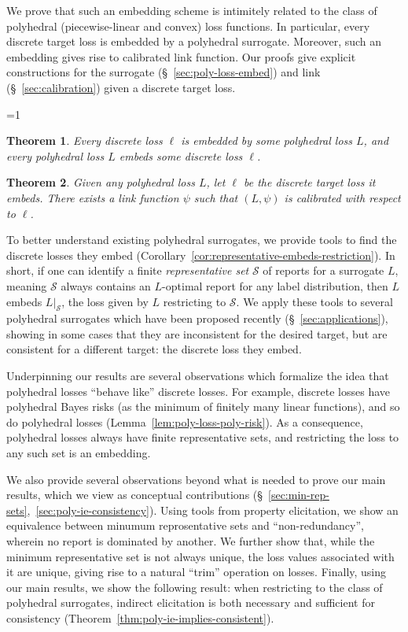 \documentclass[11pt]{article}
\newcommand{\Comments}{1}
\newcommand{\mytodo}[2]{\ifnum\Comments=1%
  \todo[linecolor=#1!80!black,backgroundcolor=#1,bordercolor=#1!80!black]{#2}\fi}
\newcommand{\jessiet}[1]{\mytodo{teal!20!white}{JF: #1}}
\newcommand{\Sc}{\mathcal{S}}
\newtheorem{theorem}{Theorem}
\begin{document}
We prove that such an embedding scheme is intimitely related to the class of polyhedral (piecewise-linear and convex) loss functions.
In particular, every discrete target loss is embedded by a polyhedral surrogate.
Moreover, such an embedding gives rise to calibrated link function.
Our proofs give explicit constructions for the surrogate (\S~\ref{sec:poly-loss-embed}) and link (\S~\ref{sec:calibration}) given a discrete target loss.

\jessiet{Want these as restatables so the numbering is consistent?}
\begin{theorem}\label{thm:embed-poly-informal}
  Every discrete loss $\ell$ is embedded by some polyhedral loss $L$, and every polyhedral loss $L$ embeds some discrete loss $\ell$.
\end{theorem}

\begin{theorem}\label{thm:link-informal}
  Given any polyhedral loss $L$, let $\ell$ be the discrete target loss it embeds. There exists a link function $\psi$ such that $(L,\psi)$ is calibrated with respect to $\ell$.
\end{theorem}

To better understand existing polyhedral surrogates, we provide tools to find the discrete losses they embed (Corollary~\ref{cor:representative-embeds-restriction}).
In short, if one can identify a finite \emph{representative set} $\Sc$ of reports for a surrogate $L$, meaning $\Sc$ always contains an $L$-optimal report for any label distribution, then $L$ embeds $L|_\Sc$, the loss given by $L$ restricting to $\Sc$.
We apply these tools to several polyhedral surrogates which have been proposed recently (\S~\ref{sec:applications}), showing in some cases that they are inconsistent for the desired target, but are consistent for a different target: the discrete loss they embed.

Underpinning our results are several observations which formalize the idea that polyhedral losses ``behave like'' discrete losses.
For example, discrete losses have polyhedral Bayes risks (as the minimum of finitely many linear functions), and so do polyhedral losses (Lemma~\ref{lem:poly-loss-poly-risk}).
As a consequence, polyhedral losses always have finite representative sets, and restricting the loss to any such set is an embedding.

We also provide several observations beyond what is needed to prove our main results, which we view as conceptual contributions (\S~\ref{sec:min-rep-sets},~\ref{sec:poly-ie-consistency}).
Using tools from property elicitation, we show an equivalence between minumum reprosentative sets and ``non-redundancy'', wherein no report is dominated by another.
We further show that, while the minimum representative set is not always unique, the loss values associated with it are unique, giving rise to a natural ``trim'' operation on losses.
Finally, using our main results, we show the following result: when restricting to the class of polyhedral surrogates, indirect elicitation is both necessary and sufficient for consistency (Theorem~\ref{thm:poly-ie-implies-consistent}).
\end{document}
